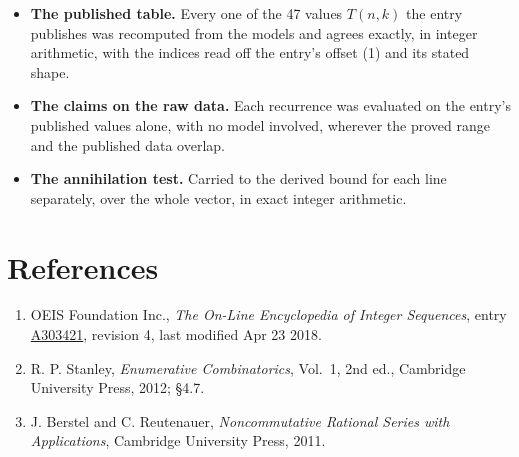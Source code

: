 \documentclass[11pt]{article}
\theoremstyle{definition}
\begin{document}
\begin{itemize}

\item {\bfseries The published table.} Every one of the 47 values $T(n,k)$ the entry publishes was recomputed from the models and agrees exactly, in integer arithmetic, with the indices read off the entry's offset (1) and its stated shape.

\item {\bfseries The claims on the raw data.} Each recurrence was evaluated on the entry's published values alone, with no model involved, wherever the proved range and the published data overlap.

\item {\bfseries The annihilation test.} Carried to the derived bound for each line separately, over the whole vector, in exact integer arithmetic.

\end{itemize}

\section{References}

\begin{enumerate}

\item OEIS Foundation Inc., \emph{The On-Line Encyclopedia of Integer Sequences}, entry \href{https://oeis.org/A303421}{A303421}, revision 4, last modified Apr 23 2018.

\item R. P. Stanley, \emph{Enumerative Combinatorics}, Vol.~1, 2nd ed., Cambridge University Press, 2012; \S4.7.

\item J. Berstel and C. Reutenauer, \emph{Noncommutative Rational Series with Applications}, Cambridge University Press, 2011.

\end{enumerate}
\end{document}
